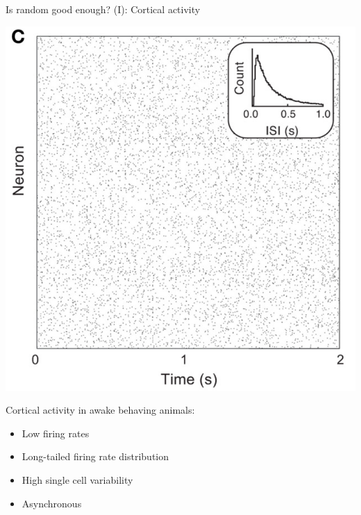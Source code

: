 \documentclass[fleqn]{beamer}
\newcommand{\ppc}[1]{\pause\setcounter{page}{#1}}
\begin{document}
\begin{frame}{Is random good enough? (I): Cortical activity}
\begin{minipage}{.48\linewidth}
  \begin{center}
  \includegraphics[width=.7\textwidth]{figures/doiron0.png}
  \end{center}
  \begin{flushright}
    {\footnotesize \cite{Doiron2014}}
  \end{flushright}
\end{minipage}\ppc{3}
\begin{minipage}{.48\linewidth}
  Cortical activity in awake behaving animals:\ppc{3}
    \begin{itemize}
    \item Low firing rates\ppc{3}
    \item Long-tailed firing rate distribution\ppc{3}
    \item High single cell variability\ppc{3}
    \item Asynchronous \ppc{3}
  \end{itemize}
\end{minipage}
\end{frame}
\end{document}
